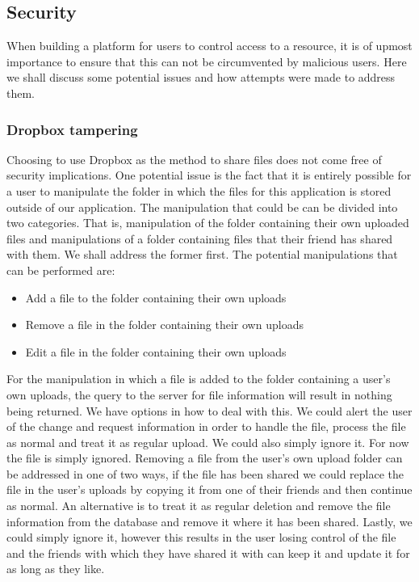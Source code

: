 \documentclass[12pt, titlepage]{article}
\begin{document}
\subsection{Security}
When building a platform for users to control access to a resource, it is of upmost importance to ensure that this can not be circumvented by malicious users. Here we shall discuss some potential issues and how attempts were made to address them.
\subsubsection{Dropbox tampering}
Choosing to use Dropbox as the method to share files does not come free of security implications. One potential issue is the fact that it is entirely possible for a user to manipulate the folder in which the files for this application is stored outside of our application. The manipulation that could be can be divided into two categories. That is, manipulation of the folder containing their own uploaded files and manipulations of a folder containing files that their friend has shared with them. We shall address the former first. The potential manipulations that can be performed are:
\begin{itemize}
	\item Add a file to the folder containing their own uploads
	\item Remove a file in the folder containing their own uploads
	\item Edit a file in the folder containing their own uploads
\end{itemize}
For the manipulation in which a file is added to the folder containing a user's own uploads, the query to the server for file information will result in nothing being returned. We have options in how to deal with this. We could alert the user of the change and request information in order to handle the file, process the file as normal and treat it as regular upload. We could also simply ignore it. For now the file is simply ignored.
\newline \indent Removing a file from the user's own upload folder can be addressed in one of two ways, if the file has been shared we could replace the file in the user's uploads by copying it from one of their friends and then continue as normal. An alternative is to treat it as regular deletion and remove the file information from the database and remove it where it has been shared. Lastly, we could simply ignore it, however this results in the user losing control of the file and the friends with which they have shared it with can keep it and update it for as long as they like.
\end{document}
